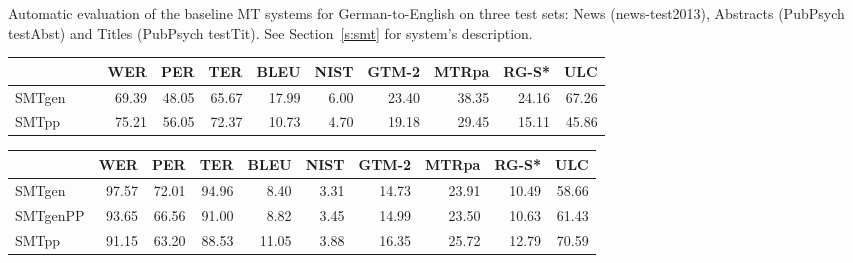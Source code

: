 \documentclass[a4paper,11pt]{article}
\begin{document}
\begin{table}[t]
 \caption{Automatic evaluation of the baseline MT systems for German-to-English on three test sets: News (news-test2013), Abstracts (PubPsych testAbst) and Titles (PubPsych testTit). See Section~\ref{s:smt} for system's description.}
 \label{tab:DeEn}
\end{table}



\begin{table}[t]
\small

\begin{tabular}{lrrrrrrrrr}
\toprule
         & WER   &  PER  & TER   &  BLEU & NIST & GTM-2 & MTRpa & RG-S* & ULC \\
\midrule
SMTgen~~~~ & 69.39 & 48.05 & 65.67 & 17.99 & 6.00 & 23.40 & 38.35 & 24.16 & 67.26 \\  
SMTpp	 & 75.21 & 56.05 & 72.37 & 10.73 & 4.70 & 19.18 & 29.45 & 15.11 & 45.86 \\  
\bottomrule
\end{tabular}

\begin{tabular}{lrrrrrrrrr}
\toprule
         & WER   &  PER  & TER   &  BLEU & NIST & GTM-2 & MTRpa & RG-S* & ULC \\
\midrule
SMTgen	 &  97.57 & 72.01 &  94.96 & 8.40 & 3.31 & 14.73 & 23.91 & 10.49 & 58.66 \\  
SMTgenPP &  93.65 & 66.56 &  91.00 & 8.82 & 3.45 & 14.99 & 23.50 & 10.63 & 61.43 \\  
SMTpp	 &  91.15 & 63.20 &  88.53 &11.05 & 3.88 & 16.35 & 25.72 & 12.79 & 70.59 \\  
\bottomrule
\end{tabular}



\end{table}
\end{document}
